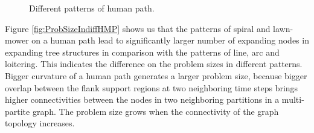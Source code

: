 \documentclass[12pt]{article}
\begin{document}
\begin{figure}[H] 
  \centering 
  \caption{Different patterns of human path.} 
  \label{fig:diffHMP} %
\end{figure}

Figure \ref{fig:ProbSizeIndiffHMP} shows us that the patterns of spiral and lawn-mower on a human path lead to significantly larger number of expanding nodes in expanding tree structures in comparison with the patterns of line, arc and loitering.
This indicates the difference on the problem sizes in different patterns.
Bigger curvature of a human path generates a larger problem size, because bigger overlap between the flank support regions at two neighboring time steps brings higher connectivities between the nodes in two neighboring partitions in a multi-partite graph.
The problem size grows when the connectivity of the graph topology increases.
\end{document}
